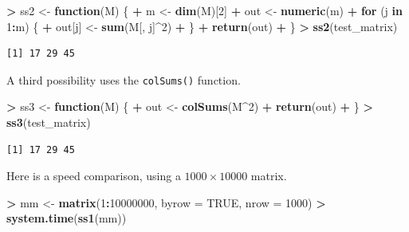 \documentclass[]{krantz}
\makeatletter
\newenvironment{Shaded}{\begin{snugshade}}{\end{snugshade}}
\newcommand{\ControlFlowTok}[1]{\textcolor[rgb]{0.27,0.27,0.27}{\textbf{#1}}}
\newcommand{\DataTypeTok}[1]{\textcolor[rgb]{0.27,0.27,0.27}{#1}}
\newcommand{\DecValTok}[1]{\textcolor[rgb]{0.06,0.06,0.06}{#1}}
\newcommand{\KeywordTok}[1]{\textcolor[rgb]{0.27,0.27,0.27}{\textbf{#1}}}
\newcommand{\NormalTok}[1]{#1}
\newcommand{\OperatorTok}[1]{\textcolor[rgb]{0.43,0.43,0.43}{\textbf{#1}}}
\newcommand{\OtherTok}[1]{\textcolor[rgb]{0.37,0.37,0.37}{#1}}
\newcommand{\StringTok}[1]{\textcolor[rgb]{0.5,0.5,0.5}{#1}}
\newenvironment{kframe}{%
\medskip{}
\setlength{\fboxsep}{.8em}
 \def\at@end@of@kframe{}%
 \ifinner\ifhmode%
  \def\at@end@of@kframe{\end{minipage}}%
  \begin{minipage}{\columnwidth}%
 \fi\fi%
 \def\FrameCommand##1{\hskip\@totalleftmargin \hskip-\fboxsep
 \colorbox{shadecolor}{##1}\hskip-\fboxsep
     \hskip-\linewidth \hskip-\@totalleftmargin \hskip\columnwidth}%
 \MakeFramed {\advance\hsize-\width
   \@totalleftmargin\z@ \linewidth\hsize
   \@setminipage}}%
 {\par\unskip\endMakeFramed%
 \at@end@of@kframe}
\renewenvironment{Shaded}{\begin{kframe}}{\end{kframe}}
\makeatother
\begin{document}
\begin{Shaded}
\begin{Highlighting}[]
\OperatorTok{>}\StringTok{ }\NormalTok{ss2 <-}\StringTok{ }\ControlFlowTok{function}\NormalTok{(M) \{}
\OperatorTok{+}\StringTok{   }\NormalTok{m <-}\StringTok{ }\KeywordTok{dim}\NormalTok{(M)[}\DecValTok{2}\NormalTok{]}
\OperatorTok{+}\StringTok{   }\NormalTok{out <-}\StringTok{ }\KeywordTok{numeric}\NormalTok{(m)}
\OperatorTok{+}\StringTok{   }\ControlFlowTok{for}\NormalTok{ (j }\ControlFlowTok{in} \DecValTok{1}\OperatorTok{:}\NormalTok{m) \{}
\OperatorTok{+}\StringTok{     }\NormalTok{out[j] <-}\StringTok{ }\KeywordTok{sum}\NormalTok{(M[, j]}\OperatorTok{^}\DecValTok{2}\NormalTok{)}
\OperatorTok{+}\StringTok{   }\NormalTok{\}}
\OperatorTok{+}\StringTok{   }\KeywordTok{return}\NormalTok{(out)}
\OperatorTok{+}\StringTok{ }\NormalTok{\}}
\OperatorTok{>}\StringTok{ }\KeywordTok{ss2}\NormalTok{(test_matrix)}
\end{Highlighting}
\end{Shaded}

\begin{verbatim}
[1] 17 29 45
\end{verbatim}

A third possibility uses the \texttt{colSums()} function.

\begin{Shaded}
\begin{Highlighting}[]
\OperatorTok{>}\StringTok{ }\NormalTok{ss3 <-}\StringTok{ }\ControlFlowTok{function}\NormalTok{(M) \{}
\OperatorTok{+}\StringTok{   }\NormalTok{out <-}\StringTok{ }\KeywordTok{colSums}\NormalTok{(M}\OperatorTok{^}\DecValTok{2}\NormalTok{)}
\OperatorTok{+}\StringTok{   }\KeywordTok{return}\NormalTok{(out)}
\OperatorTok{+}\StringTok{ }\NormalTok{\}}
\OperatorTok{>}\StringTok{ }\KeywordTok{ss3}\NormalTok{(test_matrix)}
\end{Highlighting}
\end{Shaded}

\begin{verbatim}
[1] 17 29 45
\end{verbatim}

Here is a speed comparison, using a \(1000\times 10000\) matrix.

\begin{Shaded}
\begin{Highlighting}[]
\OperatorTok{>}\StringTok{ }\NormalTok{mm <-}\StringTok{ }\KeywordTok{matrix}\NormalTok{(}\DecValTok{1}\OperatorTok{:}\DecValTok{10000000}\NormalTok{, }\DataTypeTok{byrow =} \OtherTok{TRUE}\NormalTok{, }\DataTypeTok{nrow =} \DecValTok{1000}\NormalTok{)}
\OperatorTok{>}\StringTok{ }\KeywordTok{system.time}\NormalTok{(}\KeywordTok{ss1}\NormalTok{(mm))}
\end{Highlighting}
\end{Shaded}
\end{document}
